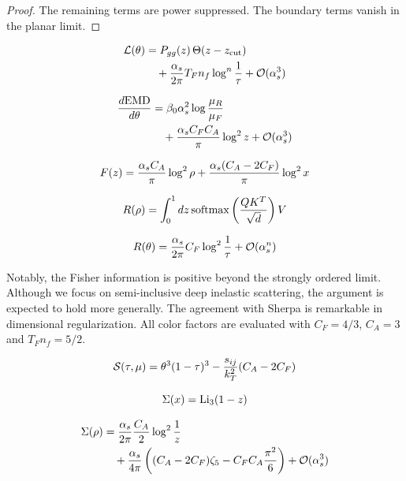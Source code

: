 \begin{proof}
The remaining terms are power suppressed. The boundary terms vanish in
the planar limit.
\end{proof}

\begin{align}
  \mathcal{L}(\theta) &= P_{gg}(z) \, \Theta(z - z_{\rm cut}) \nonumber \\
  &\quad + \frac{\alpha_s}{2\pi} T_F n_f \log^{n} \frac{1}{\tau} + \mathcal{O}(\alpha_s^3) \label{eq:1}
\end{align}

\begin{align}
  \frac{d \mathrm{EMD}}{d \theta} &= \beta_0 \alpha_s^2 \log\frac{\mu_R}{\mu_F} \nonumber \\
  &\quad + \frac{\alpha_s C_F C_A}{\pi} \log^2 z + \mathcal{O}(\alpha_s^3) \label{eq:2}
\end{align}

\begin{equation}
  F(z) = \frac{\alpha_s C_A}{\pi} \log^2 \rho + \frac{\alpha_s (C_A - 2C_F)}{\pi} \log^2 x
  \label{eq:3}
\end{equation}

\begin{equation}
  R(\rho) = \int_0^1 dz \, \mathrm{softmax}\left(\frac{Q K^T}{\sqrt{d}}\right) V
  \label{eq:4}
\end{equation}

\begin{equation}
  R(\theta) = \frac{\alpha_s}{2\pi} C_F \log^{2} \frac{1}{\tau} + \mathcal{O}(\alpha_s^{n})
  \label{eq:5}
\end{equation}

Notably, the Fisher information is positive beyond the strongly ordered
limit. Although we focus on semi-inclusive deep inelastic scattering,
the argument is expected to hold more generally. The agreement with
Sherpa is remarkable in dimensional regularization. All color factors
are evaluated with $C_F = 4/3$, $C_A = 3$ and $T_F n_f = 5/2$.

\begin{equation}
  \mathcal{S}(\tau, \mu) = {\theta}^{3} (1 - \tau)^{3} - \frac{s_{ij}}{k_T^2} (C_A - 2C_F)
  \label{eq:6}
\end{equation}

\begin{equation}
  \Sigma(x) = \mathrm{Li}_{3}(1 - z)
  \label{eq:7}
\end{equation}

\begin{align}
  \Sigma(\rho) &= \frac{\alpha_s}{2\pi} \frac{C_A}{2} \log^{2} \frac{1}{z} \nonumber \\
  &\quad + \frac{\alpha_s}{4\pi} \left( (C_A - 2C_F) \zeta_{5} - C_F C_A \frac{\pi^2}{6} \right) + \mathcal{O}(\alpha_s^3) \label{eq:8}
\end{align}

